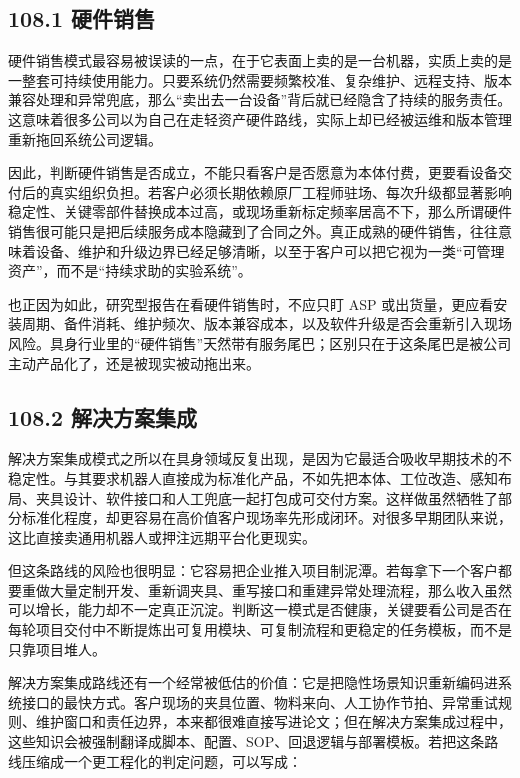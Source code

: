 \subsection*{108.1 硬件销售}


硬件销售模式最容易被误读的一点，在于它表面上卖的是一台机器，实质上卖的是一整套可持续使用能力。只要系统仍然需要频繁校准、复杂维护、远程支持、版本兼容处理和异常兜底，那么“卖出去一台设备”背后就已经隐含了持续的服务责任。这意味着很多公司以为自己在走轻资产硬件路线，实际上却已经被运维和版本管理重新拖回系统公司逻辑。

因此，判断硬件销售是否成立，不能只看客户是否愿意为本体付费，更要看设备交付后的真实组织负担。若客户必须长期依赖原厂工程师驻场、每次升级都显著影响稳定性、关键零部件替换成本过高，或现场重新标定频率居高不下，那么所谓硬件销售很可能只是把后续服务成本隐藏到了合同之外。真正成熟的硬件销售，往往意味着设备、维护和升级边界已经足够清晰，以至于客户可以把它视为一类“可管理资产”，而不是“持续求助的实验系统”。

也正因为如此，研究型报告在看硬件销售时，不应只盯 ASP 或出货量，更应看安装周期、备件消耗、维护频次、版本兼容成本，以及软件升级是否会重新引入现场风险。具身行业里的“硬件销售”天然带有服务尾巴；区别只在于这条尾巴是被公司主动产品化了，还是被现实被动拖出来。

\subsection*{108.2 解决方案集成}


解决方案集成模式之所以在具身领域反复出现，是因为它最适合吸收早期技术的不稳定性。与其要求机器人直接成为标准化产品，不如先把本体、工位改造、感知布局、夹具设计、软件接口和人工兜底一起打包成可交付方案。这样做虽然牺牲了部分标准化程度，却更容易在高价值客户现场率先形成闭环。对很多早期团队来说，这比直接卖通用机器人或押注远期平台化更现实。

但这条路线的风险也很明显：它容易把企业推入项目制泥潭。若每拿下一个客户都要重做大量定制开发、重新调夹具、重写接口和重建异常处理流程，那么收入虽然可以增长，能力却不一定真正沉淀。判断这一模式是否健康，关键要看公司是否在每轮项目交付中不断提炼出可复用模块、可复制流程和更稳定的任务模板，而不是只靠项目堆人。

解决方案集成路线还有一个经常被低估的价值：它是把隐性场景知识重新编码进系统接口的最快方式。客户现场的夹具位置、物料来向、人工协作节拍、异常重试规则、维护窗口和责任边界，本来都很难直接写进论文；但在解决方案集成过程中，这些知识会被强制翻译成脚本、配置、SOP、回退逻辑与部署模板。若把这条路线压缩成一个更工程化的判定问题，可以写成：

